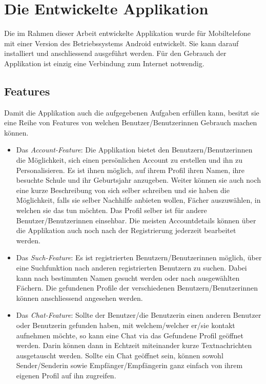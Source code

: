 \documentclass[a4paper,11pt]{report}
\begin{document}
		
	\chapter{Die Entwickelte Applikation}
	Die im Rahmen dieser Arbeit entwickelte Applikation wurde für Mobiltelefone mit einer Version des Betriebssystems Android entwickelt. Sie kann darauf installiert und anschliessend ausgeführt werden. Für den Gebrauch der Applikation ist einzig eine Verbindung zum Internet notwendig.
	
	\section{Features}
	Damit die Applikation auch die aufgegebenen Aufgaben erfüllen kann, besitzt sie eine Reihe von Features von welchen Benutzer/Benutzerinnen Gebrauch machen können.
	
	\begin{itemize}
		\item Das \emph{Account-Feature}: Die Applikation bietet den Benutzern/Benutzerinnen die Möglichkeit, sich einen persönlichen Account zu erstellen und ihn zu Personalisieren. Es ist ihnen möglich, auf ihrem Profil ihren Namen, ihre besuchte Schule und ihr Geburtsjahr anzugeben. Weiter können sie auch noch eine kurze Beschreibung von sich selber schreiben und sie haben die Möglichkeit, falls sie selber Nachhilfe anbieten wollen, Fächer auszuwählen, in welchen sie das tun möchten. Das Profil selber ist für andere Benutzer/Benutzerinnen einsehbar. Die meisten Accountdetails können über die Applikation auch noch nach der Registrierung jederzeit bearbeitet werden.
		\item Das \emph{Such-Feature}: Es ist registrierten Benutzern/Benutzerinnen möglich, über eine Suchfunktion nach anderen registrierten Benutzern zu suchen. Dabei kann nach bestimmten Namen gesucht werden oder nach ausgewählten Fächern. Die gefundenen Profile der verschiedenen Benutzern/Benutzerinnen können anschliessend angesehen werden.
		\item Das \emph{Chat-Feature}: Sollte der Benutzer/die Benutzerin einen anderen Benutzer oder Benutzerin gefunden haben, mit welchem/welcher er/sie kontakt aufnehmen möchte, so kann eine Chat via das Gefundene Profil geöffnet werden. Darin können dann in Echtzeit miteinander kurze Textnachrichten ausgetauscht werden. Sollte ein Chat geöffnet sein, können sowohl Sender/Senderin sowie Empfänger/Empfängerin ganz einfach von ihrem eigenen Profil auf ihn zugreifen.
	\end{itemize}
	
\end{document}
